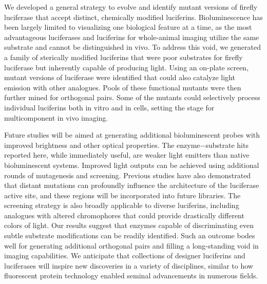 We developed a general strategy to evolve and identify mutant
versions of firefly luciferase that accept distinct, chemically
modified luciferins. Bioluminescence has been largely limited to
visualizing one biological feature at a time, as the most
advantageous luciferases and luciferins for whole-animal
imaging utilize the same substrate and cannot be distinguished
in vivo. To address this void, we generated a family of sterically
modified luciferins that were poor substrates for firefly
luciferase but inherently capable of producing light. Using an
on-plate screen, mutant versions of luciferase were identified
that could also catalyze light emission with other analogues.
Pools of these functional mutants were then further mined for
orthogonal pairs. Some of the mutants could selectively process
individual luciferins both in vitro and in cells, setting the stage
for multicomponent in vivo imaging.
\par
Future studies will be aimed at generating additional
bioluminescent probes with improved brightness and other
optical properties. The enzyme−substrate hits reported here,
while immediately useful, are weaker light emitters than native
bioluminescent systems. Improved light outputs can be
achieved using additional rounds of mutagenesis and screening.
Previous studies have also demonstrated that distant mutations
can profoundly influence the architecture of the luciferase active
site, and these regions will be incorporated into future libraries.
The screening strategy is also broadly applicable to diverse
luciferins, including analogues with altered chromophores that
could provide drastically different colors of light. Our results suggest that enzymes capable of discriminating even subtle
substrate modifications can be readily identified. Such an
outcome bodes well for generating additional orthogonal pairs
and filling a long-standing void in imaging capabilities. We
anticipate that collections of designer luciferins and luciferases
will inspire new discoveries in a variety of disciplines, similar to
how fluorescent protein technology enabled seminal advancements
in numerous fields.





